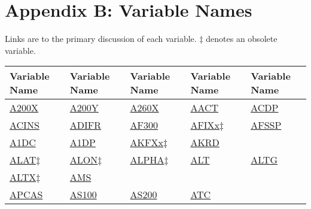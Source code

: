\documentclass[
  english,
]{book}
\begin{document}
\hypertarget{appendix-b-variable-names}{%
\chapter*{Appendix B: Variable Names}\label{appendix-b-variable-names}}

Links are to the primary discussion of each variable. \(\ddagger\) denotes an obsolete variable.

\begin{longtable}[]{@{}lllll@{}}
\toprule
Variable Name & Variable Name & Variable Name & Variable Name & Variable Name \\
\midrule
\endhead
\href{/rmd_output/1/5-cloud-physics-variables.html\#CRPC}{A200X} & \href{/rmd_output/1/5-cloud-physics-variables.html\#CRPC}{A200Y} & \href{/rmd_output/1/5-cloud-physics-variables.html\#CRPC}{A260X} & \href{/rmd_output/1/10-obsolete-variables.html\#AACT}{AACT} & \href{/rmd_output/1/5-cloud-physics-variables.html\#CRPC}{ACDP} \\
\href{/rmd_output/1/3-the-state-of-the-aircraft.html\#ACINS}{ACINS} & \href{/rmd_output/1/4-the-state-of-the-atmosphere.html\#adifr}{ADIFR} & \href{/rmd_output/1/5-cloud-physics-variables.html\#CRPC}{AF300} & \href{/rmd_output/1/10-obsolete-variables.html\#vanes}{AFIXx\(\ddagger\)} & \href{/rmd_output/1/5-cloud-physics-variables.html\#CRPC}{AFSSP} \\
\href{/rmd_output/1/5-cloud-physics-variables.html\#a1dc-a1dp}{A1DC} & \href{/rmd_output/1/5-cloud-physics-variables.html\#a1dc-a1dp}{A1DP} & \href{/rmd_output/1/10-obsolete-variables.html\#akfxx}{AKFXx\(\ddagger\)} & \href{/rmd_output/1/4-the-state-of-the-atmosphere.html\#akrd}{AKRD} & \\
\href{/rmd_output/1/10-obsolete-variables.html\#ltn51}{ALAT\(\ddagger\)} & \href{/rmd_output/1/10-obsolete-variables.html\#ltn51}{ALON\(\ddagger\)} & \href{/rmd_output/1/10-obsolete-variables.html\#ltn51}{ALPHA\(\ddagger\)} & \href{/rmd_output/1/3-the-state-of-the-aircraft.html\#alt}{ALT} & \href{/rmd_output/1/3-the-state-of-the-aircraft.html\#altg}{ALTG} \\
\href{/rmd_output/1/3-the-state-of-the-aircraft.html\#altx}{ALTX\(\ddagger\)} & \href{/rmd_output/1/7-aerosol-particle-measurements.html\#special-aerosol}{AMS} & & & \\
\href{/rmd_output/1/5-cloud-physics-variables.html\#CRPC}{APCAS} & \href{/rmd_output/1/5-cloud-physics-variables.html\#CRPC}{AS100} & \href{/rmd_output/1/5-cloud-physics-variables.html\#CRPC}{AS200} & \href{/rmd_output/1/10-obsolete-variables.html\#atc}{ATC} & \\

\end{longtable}
\end{document}
